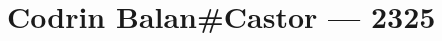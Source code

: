 \hypertarget{codrin-balancastor-2325}{%
\chapter{Codrin Balan\#Castor — 2325}\label{codrin-balancastor-2325}}
